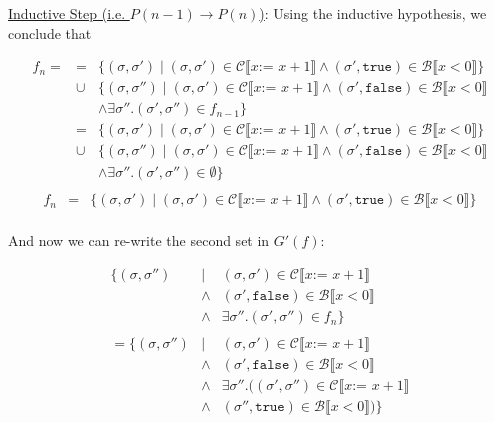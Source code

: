 \documentclass[10pt, oneside]{article}
\begin{document}
\begin{enumerate}[1.]
\begin{enumerate} [(a)]
      \underline{Inductive Step (i.e. $P(n - 1) \rightarrow P(n)$)}: Using the 
      inductive hypothesis, we conclude that 
      
      \begin{eqnarray*}
        f_n = & = & \{ (\sigma, \sigma') \mid (\sigma, \sigma') \in \mathcal{C} \llbracket x \texttt{:= } x + 1 \rrbracket \wedge (\sigma', \texttt{true}) \in \mathcal{B} \llbracket x < 0 \rrbracket \}  \\
        & \cup & \{ (\sigma, \sigma'') \mid (\sigma, \sigma')  \in \mathcal{C} \llbracket x \texttt{:= } x + 1 \rrbracket \wedge (\sigma', \texttt{false})\in \mathcal{B} \llbracket x < 0 \rrbracket \\
				& & \wedge \exists \sigma''. (\sigma', \sigma'') \in f_{n-1} \} \\
				& = & \{ (\sigma, \sigma') \mid (\sigma, \sigma') \in \mathcal{C} \llbracket x \texttt{:= } x + 1 \rrbracket \wedge (\sigma', \texttt{true}) \in \mathcal{B} \llbracket x < 0 \rrbracket \}  \\
        & \cup & \{ (\sigma, \sigma'') \mid (\sigma, \sigma')  \in \mathcal{C} \llbracket x \texttt{:= } x + 1 \rrbracket \wedge (\sigma', \texttt{false})\in \mathcal{B} \llbracket x < 0 \rrbracket \\
				& & \wedge \exists \sigma''. (\sigma', \sigma'') \in \emptyset \} \\
			\end{eqnarray*}
			\begin{eqnarray*}
				f_n & = & \{ (\sigma, \sigma') \mid (\sigma, \sigma') \in \mathcal{C} \llbracket x \texttt{:= } x + 1 \rrbracket \wedge (\sigma', \texttt{true}) \in \mathcal{B} \llbracket x < 0 \rrbracket \}  \\
			\end{eqnarray*}
			
			\pagebreak
			And now we can re-write the second set in $G'(f)$:
			
			\begin{eqnarray*}
			  \{ (\sigma, \sigma'') & \mid & (\sigma, \sigma')  \in \mathcal{C} \llbracket x \texttt{:= } x + 1 \rrbracket \\ 
			  & \wedge & (\sigma', \texttt{false})\in \mathcal{B} \llbracket x < 0 \rrbracket \\
				& \wedge & \exists \sigma''. (\sigma', \sigma'') \in f_n \} \\
				& & \\
				= \{ (\sigma, \sigma'') & \mid & (\sigma, \sigma')  \in \mathcal{C} \llbracket x \texttt{:= } x + 1 \rrbracket \\ 
			  & \wedge & (\sigma', \texttt{false})\in \mathcal{B} \llbracket x < 0 \rrbracket \\
				& \wedge & \exists \sigma''. ((\sigma', \sigma'') \in \mathcal{C} \llbracket x \texttt{:= } x + 1 \rrbracket \\
				& \wedge & (\sigma'', \texttt{true}) \in \mathcal{B} \llbracket x < 0 \rrbracket) \}
			\end{eqnarray*}
			

\end{enumerate}
\end{enumerate}
\end{document}
